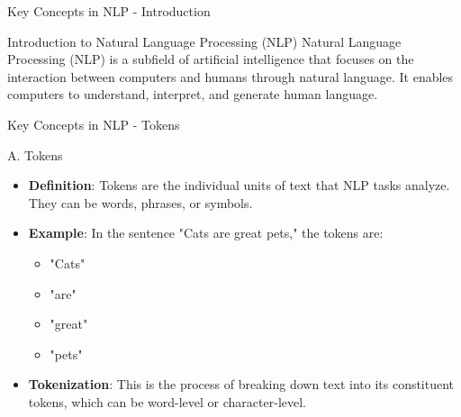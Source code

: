 \documentclass[aspectratio=169]{beamer}
\begin{document}
\begin{frame}[fragile]{Key Concepts in NLP - Introduction}
    \begin{block}{Introduction to Natural Language Processing (NLP)}
        Natural Language Processing (NLP) is a subfield of artificial intelligence that focuses on the interaction between computers and humans through natural language. It enables computers to understand, interpret, and generate human language.
    \end{block}
\end{frame}

\begin{frame}[fragile]{Key Concepts in NLP - Tokens}
    \begin{block}{A. Tokens}
        \begin{itemize}
            \item \textbf{Definition}: Tokens are the individual units of text that NLP tasks analyze. They can be words, phrases, or symbols.
            \item \textbf{Example}: In the sentence "Cats are great pets," the tokens are:
            \begin{itemize}
                \item "Cats"
                \item "are"
                \item "great"
                \item "pets"
            \end{itemize}
            \item \textbf{Tokenization}: This is the process of breaking down text into its constituent tokens, which can be word-level or character-level.
        \end{itemize}
    \end{block}
\end{frame}
\end{document}
